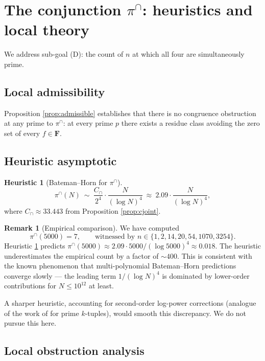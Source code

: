 \documentclass[11pt]{article}
\theoremstyle{definition}
\newtheorem{remark}[theorem]{Remark}
\newtheorem{heuristic}[theorem]{Heuristic}
\newcommand{\F}{\mathbf{F}}
\newcommand{\F}{\mathcal{F}}
\begin{document}
\section{The conjunction $\pi^\cap$: heuristics and local theory}\label{sec:joint-density}

We address sub-goal (D): the count of $n$ at which all four are simultaneously prime.

\subsection{Local admissibility}

Proposition \ref{prop:admissible} establishes that there is no congruence obstruction at any prime to $\pi^\cap$: at every prime $p$ there exists a residue class avoiding the zero set of every $f\in\F$.

\subsection{Heuristic asymptotic}

\begin{heuristic}[Bateman--Horn for $\pi^\cap$]\label{heur:cap-asym}
\[
\pi^\cap(N)\ \sim\ \frac{C_\cap}{2^4}\cdot\frac{N}{(\log N)^4}\ \approx\ 2.09\cdot\frac{N}{(\log N)^4},
\]
where $C_\cap\approx 33.443$ from Proposition \ref{prop:cjoint}.
\end{heuristic}

\begin{remark}[Empirical comparison]
We have computed
\[
\pi^\cap(5000) = 7,\qquad \text{witnessed by } n\in\{1,2,14,20,54,1070,3254\}.
\]
Heuristic \ref{heur:cap-asym} predicts $\pi^\cap(5000)\approx 2.09\cdot 5000/(\log 5000)^4\approx 0.018$. The heuristic underestimates the empirical count by a factor of $\sim 400$. This is consistent with the known phenomenon that multi-polynomial Bateman--Horn predictions converge slowly --- the leading term $1/(\log N)^4$ is dominated by lower-order contributions for $N\le 10^{12}$ at least.

A sharper heuristic, accounting for second-order log-power corrections (analogue of the work of \cite{batemanhorn} for prime $k$-tuples), would smooth this discrepancy. We do not pursue this here.
\end{remark}

\subsection{Local obstruction analysis}
\end{document}
